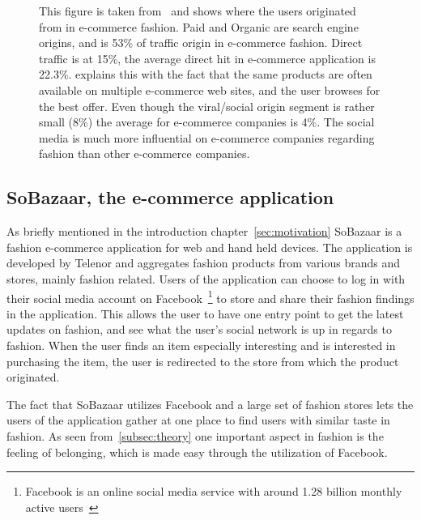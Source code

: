   \begin{figure}[H]
    \centering
    \caption[Traffic Sources In Fashion]{This figure is taken from~\cite{Jorij2012} and shows where the users originated from in e-commerce fashion.
    Paid and Organic are search engine origins, and is 53\% of traffic origin in e-commerce fashion.
    Direct traffic is at 15\%, the average direct hit in e-commerce application is 22.3\%.
    \cite{Jorij2012} explains this with the fact that the same products are often available on multiple e-commerce web sites, and the user browses for the best offer.
    Even though the viral/social origin segment is rather small (8\%) the average for e-commerce companies is 4\%.
    The social media is much more influential on e-commerce companies regarding fashion than other e-commerce companies.}
  \end{figure}

\subsection{SoBazaar, the e-commerce application}
  As briefly mentioned in the introduction chapter~\ref{sec:motivation} SoBazaar is a fashion e-commerce application for web and hand held devices.
  The application is developed by Telenor and aggregates fashion products from various brands and stores, mainly fashion related.
  Users of the application can choose to log in with their social media account on Facebook~\footnote{Facebook is an online social media service with around 1.28 billion monthly active users~\cite{facebook}} to store and share their fashion findings in the application.
  This allows the user to have one entry point to get the latest updates on fashion, and see what the user's social network is up in regards to fashion.
  When the user finds an item especially interesting and is interested in purchasing the item, the user is redirected to the store from which the product originated.

  The fact that SoBazaar utilizes Facebook and a large set of fashion stores lets the users of the application gather at one place to find users with similar taste in fashion.
  As seen from~\ref{subsec:theory} one important aspect in fashion is the feeling of belonging, which is made easy through the utilization of Facebook.

